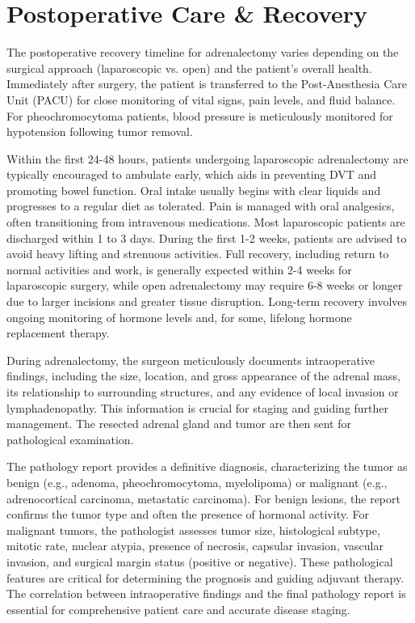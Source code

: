 \section*{Postoperative Care \& Recovery}
The postoperative recovery timeline for adrenalectomy varies depending on the surgical approach (laparoscopic vs. open) and the patient's overall health. Immediately after surgery, the patient is transferred to the Post-Anesthesia Care Unit (PACU) for close monitoring of vital signs, pain levels, and fluid balance. For pheochromocytoma patients, blood pressure is meticulously monitored for hypotension following tumor removal.

Within the first 24-48 hours, patients undergoing laparoscopic adrenalectomy are typically encouraged to ambulate early, which aids in preventing DVT and promoting bowel function. Oral intake usually begins with clear liquids and progresses to a regular diet as tolerated. Pain is managed with oral analgesics, often transitioning from intravenous medications. Most laparoscopic patients are discharged within 1 to 3 days. During the first 1-2 weeks, patients are advised to avoid heavy lifting and strenuous activities. Full recovery, including return to normal activities and work, is generally expected within 2-4 weeks for laparoscopic surgery, while open adrenalectomy may require 6-8 weeks or longer due to larger incisions and greater tissue disruption. Long-term recovery involves ongoing monitoring of hormone levels and, for some, lifelong hormone replacement therapy.

During adrenalectomy, the surgeon meticulously documents intraoperative findings, including the size, location, and gross appearance of the adrenal mass, its relationship to surrounding structures, and any evidence of local invasion or lymphadenopathy. This information is crucial for staging and guiding further management. The resected adrenal gland and tumor are then sent for pathological examination.

The pathology report provides a definitive diagnosis, characterizing the tumor as benign (e.g., adenoma, pheochromocytoma, myelolipoma) or malignant (e.g., adrenocortical carcinoma, metastatic carcinoma). For benign lesions, the report confirms the tumor type and often the presence of hormonal activity. For malignant tumors, the pathologist assesses tumor size, histological subtype, mitotic rate, nuclear atypia, presence of necrosis, capsular invasion, vascular invasion, and surgical margin status (positive or negative). These pathological features are critical for determining the prognosis and guiding adjuvant therapy. The correlation between intraoperative findings and the final pathology report is essential for comprehensive patient care and accurate disease staging.

